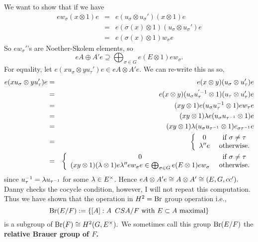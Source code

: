 We want to show that if we have 
\begin{eqnarray*}
ew_{\sigma}(x\otimes 1)e &=& e(u_{\sigma} \otimes u_{\sigma}')(x\otimes 1)e  \\ &=& e(\sigma (x) \otimes 1)(u_{\sigma}\otimes u_{\sigma}')e \\ &=& e(\sigma (x) \otimes 1)w_{\sigma}e
\end{eqnarray*}
So $ew_{\sigma}'$'s are Noether-Skolem elements, so 
$$eA \oplus A'e \supseteq \bigoplus_{\sigma \in G}e(E \otimes 1)ew_{\sigma}.$$
For equality, let $e(xu_{\sigma} \otimes yu_{\tau}')e \in eA \otimes A'e$. We can re-write this as so,
\begin{eqnarray*}
e(xu_{\sigma} \otimes yu_{\tau}')e & = & e(x\otimes y)(u_{\sigma} \otimes u_{\tau}')e \\
& = & e(x\otimes y)(u_{\sigma}u_{\tau}^{'-1}\otimes 1)(u_{\tau} \otimes u_{\tau}')e \\
& = & (xy \otimes 1)e(u_{\sigma} u_{\tau}^{-1} \otimes 1 )ew_{\tau}e \\
& = & (xy\otimes 1)\lambda e(u_{\sigma}u_{\tau^{-1}} \otimes 1)e \\
& = & (xy\otimes 1)\lambda (u_{\sigma}u_{\tau^{-1}} \otimes 1)e_{\sigma\tau^{-1} }e \\
& = & \left\lbrace \begin{array}{cc}
0 & \text{ if } \sigma \neq \tau \\ \lambda''e & \text{ otherwise.}
\end{array}\right. \\
& = & \left\lbrace \begin{array}{cc}
0 & \text{ if } \sigma \neq \tau \\ (xy\otimes 1)(\lambda \otimes 1)e\lambda''ew_{\sigma}e \in \bigoplus_{\sigma \in G}e(E \otimes 1)ew_{\sigma} & \text{ otherwise.}
\end{array}\right.
\end{eqnarray*}
since $u_{\tau}^{-1} = \lambda u_{\tau^{-1}}$ for some $\lambda \in E^{\times}$. Hence $eA \otimes A'e \cong A \otimes A' \cong (E,G,cc').$ Danny checks the cocycle condition, however, I will not repeat this computation. Thus we have shown that the operation in $H^2 = \operatorname{Br}$ group operation i.e., $$\operatorname{Br} (E/F) := \left\lbrace [A] : A \hspace{.5em} CSA/F \text{ with }E\subset A \text{ maximal} \right\rbrace$$ is a subgroup of $\operatorname{Br} (F) \cong H^2(G,E^{\times}).$ We sometimes call this group $\operatorname{Br} (E/F)$ the \textbf{relative Brauer group of $F$.}








